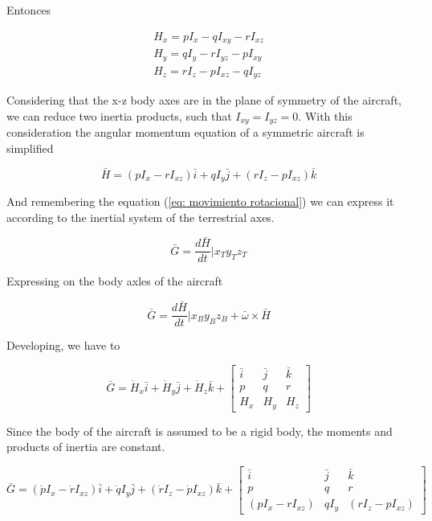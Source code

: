 Entonces

\begin{gather}
    H_x = p I_{x} - q I_{xy} - r I_{xz} \\
    H_y = q I_{y} - r I_{yz} - p I_{xy} \\
    H_z = r I_{z} - p I_{xz} - q I_{yz}
\end{gather}


Considering that the x-z body axes are in the plane of symmetry of the aircraft, we can reduce two inertia products, such that $I_{xy} = I_{yz} = 0$. With this consideration the angular momentum equation of a symmetric aircraft is simplified

\begin{equation}
    \bar{H} = (p I_{x} - r I_{xz})\bar{i} + q I_{y}\bar{j} + (r I_{z} - p I_{xz})\bar{k} 
\end{equation}

And remembering the equation (\ref{eq: movimiento rotacional}) we can express it according to the inertial system of the terrestrial axes. 

\begin{equation}
    \bar{G} = \frac{d\bar{H}}{dt} | x_T y_T z_T
\end{equation}

Expressing on the body axles of the aircraft 

\begin{equation}
    \bar{G} = \frac{d\bar{H}}{dt} | x_B y_B z_B + \bar{\omega} \times \bar{H}
\end{equation}

Developing, we have to

\begin{equation}
    \bar{G} = \dot{H}_{x} \bar{i} + \dot{H}_{y} \bar{j} + \dot{H}_{z} \bar{k} + \begin{bmatrix}
    \bar{i} & \bar{j} & \bar{k} \\
    p & q & r \\
    H_{x} & H_{y} & H_{z}
    \end{bmatrix}
\end{equation}

Since the body of the aircraft is assumed to be a rigid body, the moments and products of inertia are constant. 

\begin{equation}
    \bar{G} = (\dot{p} I_{x} - \dot{r} I_{xz})\bar{i} + \dot{q} I_{y}\bar{j} + (\dot{r} I_{z} - \dot{p} I_{xz})\bar{k} + \begin{bmatrix}
    \bar{i} & \bar{j} & \bar{k} \\
    p & q & r \\
    (p I_{x} - r I_{xz}) & q I_{y} & (r I_{z} - p I_{xz})
    \end{bmatrix} 
\end{equation}

